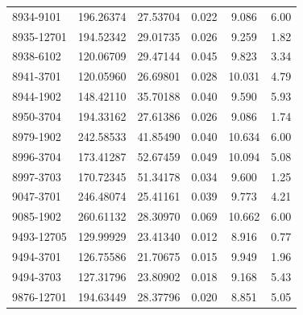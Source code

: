 \begin{table}
\begin{tabular}{lccccc}
8934-9101 & 196.26374 & 27.53704 & 0.022 & 9.086 & 6.00 \\
8935-12701 & 194.52342 & 29.01735 & 0.026 & 9.259 & 1.82 \\
8938-6102 & 120.06709 & 29.47144 & 0.045 & 9.823 & 3.34 \\
8941-3701 & 120.05960 & 26.69801 & 0.028 & 10.031 & 4.79 \\
8944-1902 & 148.42110 & 35.70188 & 0.040 & 9.590 & 5.93 \\
8950-3704 & 194.33162 & 27.61386 & 0.026 & 9.086 & 1.74 \\
8979-1902 & 242.58533 & 41.85490 & 0.040 & 10.634 & 6.00 \\
8996-3704 & 173.41287 & 52.67459 & 0.049 & 10.094 & 5.08 \\
8997-3703 & 170.72345 & 51.34178 & 0.034 & 9.600 & 1.25 \\
9047-3701 & 246.48074 & 25.41161 & 0.039 & 9.773 & 4.21 \\
9085-1902 & 260.61132 & 28.30970 & 0.069 & 10.662 & 6.00 \\
9493-12705 & 129.99929 & 23.41340 & 0.012 & 8.916 & 0.77 \\
9494-3701 & 126.75586 & 21.70675 & 0.015 & 9.949 & 1.96 \\
9494-3703 & 127.31796 & 23.80902 & 0.018 & 9.168 & 5.43 \\
9876-12701 & 194.63449 & 28.37796 & 0.020 & 8.851 & 5.05 \\
\hline
\end{tabular}
\end{table}

